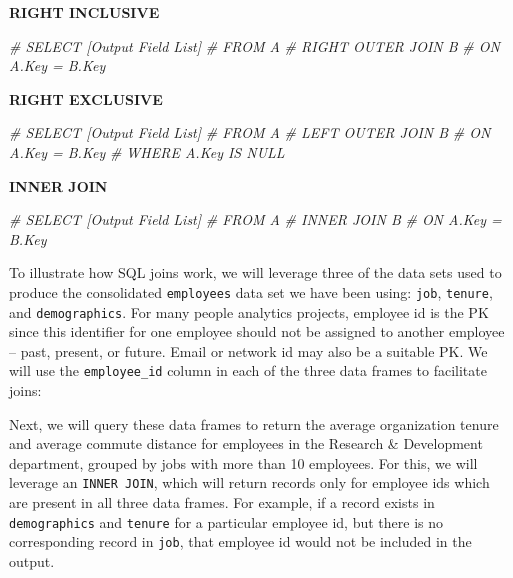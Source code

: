 \documentclass[
]{book}
\newenvironment{Shaded}{\begin{snugshade}}{\end{snugshade}}
\newcommand{\CommentTok}[1]{\textcolor[rgb]{0.56,0.35,0.01}{\textit{#1}}}
\begin{document}
\textbf{RIGHT INCLUSIVE}

\begin{Shaded}
\begin{Highlighting}[]
\CommentTok{\#  SELECT [Output Field List]}
\CommentTok{\#  FROM A }
\CommentTok{\#  RIGHT OUTER JOIN B}
\CommentTok{\#  ON A.Key = B.Key}
\end{Highlighting}
\end{Shaded}

\textbf{RIGHT EXCLUSIVE}

\begin{Shaded}
\begin{Highlighting}[]
\CommentTok{\#  SELECT [Output Field List]}
\CommentTok{\#  FROM A }
\CommentTok{\#  LEFT OUTER JOIN B}
\CommentTok{\#  ON A.Key = B.Key}
\CommentTok{\#  WHERE A.Key IS NULL}
\end{Highlighting}
\end{Shaded}

\textbf{INNER JOIN}

\begin{Shaded}
\begin{Highlighting}[]
\CommentTok{\#  SELECT [Output Field List]}
\CommentTok{\#  FROM A }
\CommentTok{\#  INNER JOIN B}
\CommentTok{\#  ON A.Key = B.Key}
\end{Highlighting}
\end{Shaded}

To illustrate how SQL joins work, we will leverage three of the data sets used to produce the consolidated \texttt{employees} data set we have been using: \texttt{job}, \texttt{tenure}, and \texttt{demographics}. For many people analytics projects, employee id is the PK since this identifier for one employee should not be assigned to another employee -- past, present, or future. Email or network id may also be a suitable PK. We will use the \texttt{employee\_id} column in each of the three data frames to facilitate joins:

Next, we will query these data frames to return the average organization tenure and average commute distance for employees in the Research \& Development department, grouped by jobs with more than 10 employees. For this, we will leverage an \texttt{INNER\ JOIN}, which will return records only for employee ids which are present in all three data frames. For example, if a record exists in \texttt{demographics} and \texttt{tenure} for a particular employee id, but there is no corresponding record in \texttt{job}, that employee id would not be included in the output.
\end{document}
